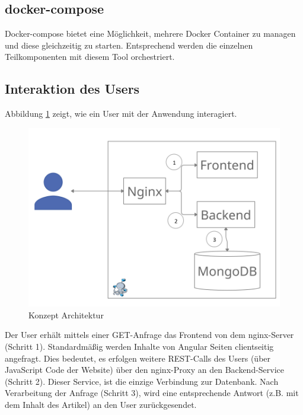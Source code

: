 \documentclass[letterpaper, 10 pt, conference]{ieeeconf}  %
\begin{document}
\subsection{docker-compose}
Docker-compose bietet eine Möglichkeit, mehrere Docker Container zu managen und diese gleichzeitig zu starten. Entsprechend werden die einzelnen Teilkomponenten mit diesem Tool orchestriert.


\subsection{Interaktion des Users}
Abbildung \ref{fig:arch} zeigt, wie ein User mit der Anwendung interagiert.

\begin{figure}[thpb]
      \centering
      \includegraphics[scale=0.35]{abbildungen/architektur.PNG}
      \caption{Konzept Architektur}
      \label{fig:arch}
 \end{figure}

Der User erhält mittels einer GET-Anfrage das Frontend von dem nginx-Server (Schritt 1). Standardmäßig werden Inhalte von Angular Seiten clientseitig angefragt. Dies bedeutet, es erfolgen weitere REST-Calls des Users (über JavaScript Code der Website) über den nginx-Proxy an den Backend-Service (Schritt 2). Dieser Service, ist die einzige Verbindung zur Datenbank. Nach Verarbeitung der Anfrage (Schritt 3), wird eine entsprechende Antwort (z.B. mit dem Inhalt des Artikel) an den User zurückgesendet.

\addtolength{\textheight}{-10cm}   %
\end{document}
